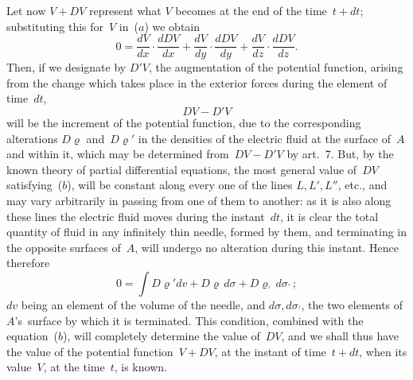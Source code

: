 \documentclass[12pt,notitlepage]{amsart}
\renewcommand{\rho}{\varrho}
\begin{document}
Let now $V+DV$ represent what $V$ becomes at the end of the time~$t+dt$;
substituting this for~$V$ in~($a$) we obtain
\[
\tag{$b$.}
0=
\frac{dV}{dx}\cdot\frac{dDV}{dx}
+\frac{dV}{dy}\cdot\frac{dDV}{dy}
+\frac{dV}{dz}\cdot\frac{dDV}{dz}.
\]
Then, if we designate by $D'V$, the augmentation of the potential function,
arising from the change which takes place in the exterior forces during the
element of time~$dt$,
\[
DV-D'V
\]
will be the increment of the potential function, due to the corresponding
alterations $D\rho$ and~$D\rho'$
in the densities of the electric fluid at the surface of~$A$
and within it, which may be determined from~${DV-D'V}$ by art.~7. But,
by the known theory of partial differential equations, the most general value 
of~$DV$ satisfying~($b$),
will be constant along every one of the lines $L, L', L''$, etc.,
and may vary arbitrarily in passing from one of them to another: as it is
also along these lines the electric fluid moves during the instant~$dt$,
it is clear
the total quantity of fluid in any infinitely thin needle, formed by them, and
terminating in the opposite surfaces of~$A$, will undergo no alteration during
this instant. Hence therefore
\[
\tag{$c$.}
0=\int D\rho'dv+D\rho\,d\sigma+D\rho_\prime\,d\sigma_\prime\,;
\]
$dv$ being an element of the volume of the needle,
and $d\sigma,d\sigma_\prime$, the two elements
of $A$'s~surface by which it is terminated. This condition, combined
with the equation~($b$), will completely determine the value of~$DV$, and we
shall thus have the value of the potential function~$V+DV$, at the instant of
time~$t+dt$, when its value~$V$, at the time~$t$, is known.
\end{document}
